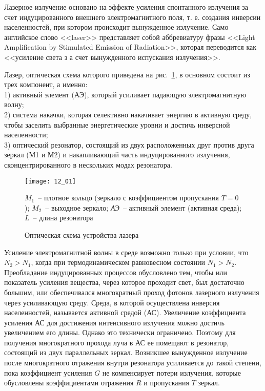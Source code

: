 
Лазерное излучение основано на эффекте усиления спонтанного излучения за 
счет индуцированного внешнего электромагнитного поля, т. е. создания инверсии 
населенностей, при котором происходит вынужденное излучение. Само английское 
слово <<laser>> представляет собой аббревиатуру фразы <<Light Amplification by 
Stimulated Emission of Radiation>>, которая переводится как <<усиление света з
а счет вынужденного испускания излучения>>.

Лазер, оптическая схема которого приведена на рис.~\ref{img12.1}, в основном
состоит из трех компонент, а именно: \\
1) активный элемент (АЭ), который усиливает падающую электромагнитную волну; \\
2) система накачки, которая селективно накачивает энергию в активную среду, 
чтобы заселить выбранные энергетические уровни и достичь инверсной 
населенности; \\
3) оптический резонатор, состоящий из двух расположенных друг против друга 
зеркал (М1 и М2) и накапливающий часть индуцированного излучения, 
сконцентрированного в нескольких модах резонатора. 

\begin{figure}[h!]
    \center
    \texttt{[image: 12\_01]}
    \caption{Оптическая схема устройства лазера}
    \label{img12.1}
    \parbox{.7\textwidth}{\footnotesize{ \( M_1 \)~-- плотное кольцо (зеркало с
      коэффициентом пропускания \( T = 0 \)); \( M_2 \)~-- выходное зеркало;
      \emph{АЭ}~-- активный элемент (активная среда); \( L \)~-- длина
      резонатора}}
\end{figure}

Усиление электромагнитной волны в среде возможно только при условии, что 
\( N_2 > N_1 \), когда при термодинамическом равновесном состоянии 
\( N_1 > N_2 \). Преобладание индуцированных процессов обусловлено тем, чтобы 
или показатель усиления вещества, через которое проходит свет, был достаточно 
большим, или обеспечивался многократный проход фотонов лазерного излучения 
через усиливающую среду. Среда, в которой осуществлена инверсия населенностей, 
называется активной средой (АС). Увеличение коэффициента усиления АС для 
достижения интенсивного излучения можно достичь увеличением его длины. Однако 
это технически ограничено. Поэтому для получения многократного прохода луча в 
АС ее помещают в резонатор, состоящий из двух параллельных зеркал. Возникшее 
вынужденное излучение после многократного отражения внутри резонатора 
усиливается до такой степени, пока коэффициент усиления \( G \) не 
компенсирует потери излучения, которые обусловлены коэффициентами 
отражения \( R \) и пропускания \( T \) зеркал.

